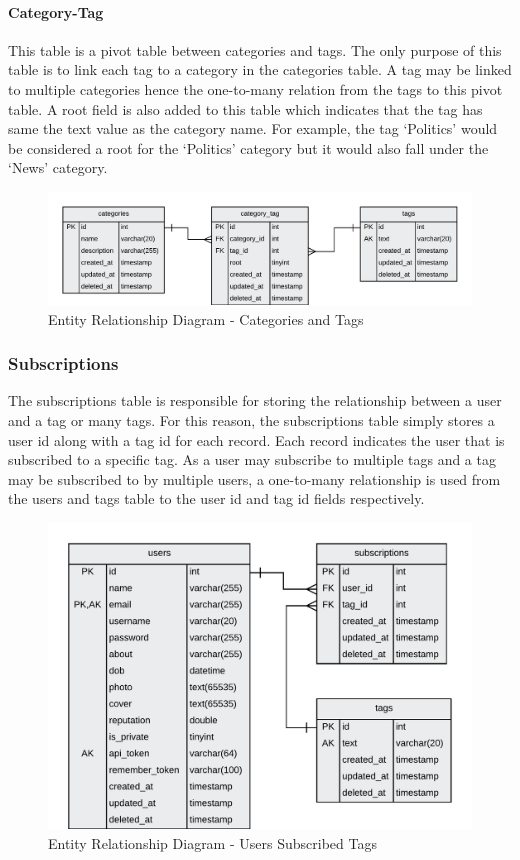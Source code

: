 \paragraph{Category-Tag}
This table is a pivot table between categories and tags. The only purpose of this table is to link each tag to a category in the categories table. A tag may be linked to multiple categories hence the one-to-many relation from the tags to this pivot table. A root field is also added to this table which indicates that the tag has same the text value as the category name. For example, the tag `Politics' would be considered a root for the `Politics' category but it would also fall under the `News' category.

\begin{figure}[H]
  \centering
  \includegraphics[width=1.0\textwidth]{Images/Design/Database/Categories}
  \caption{Entity Relationship Diagram - Categories and Tags} \label{fig:ERD_Categories}
\end{figure}

\subsubsection{Subscriptions}
The subscriptions table is responsible for storing the relationship between a user and a tag or many tags. For this reason, the subscriptions table simply stores a user id along with a tag id for each record. Each record indicates the user that is subscribed to a specific tag. As a user may subscribe to multiple tags and a tag may be subscribed to by multiple users, a one-to-many relationship is used from the users and tags table to the user id and tag id fields respectively.

\begin{figure}[H]
  \centering
  \includegraphics[width=1.0\textwidth]{Images/Design/Database/Subscriptions}
  \caption{Entity Relationship Diagram - Users Subscribed Tags} \label{fig:ERD_Subscriptions}
\end{figure}

